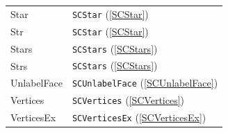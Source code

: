 \documentclass[a4paper,11pt]{report}
\begin{document}
{{ \begin{center}
\begin{tabular}{ll}Star&
\texttt{SCStar} (\ref{SCStar})\\
Str&
\texttt{SCStar} (\ref{SCStar})\\
Stars&
\texttt{SCStars} (\ref{SCStars})\\
Strs&
\texttt{SCStars} (\ref{SCStars})\\
UnlabelFace&
\texttt{SCUnlabelFace} (\ref{SCUnlabelFace})\\
Vertices&
\texttt{SCVertices} (\ref{SCVertices})\\
VerticesEx&
\texttt{SCVerticesEx} (\ref{SCVerticesEx})\\
\end{tabular}\\[2mm]
\end{center}

 }

 
}
\end{document}
